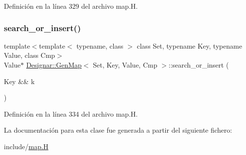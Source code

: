 Definición en la línea 329 del archivo map.\+H.

\mbox{\label{class_designar_1_1_gen_map_ae2ab69b26f782abcd99f99944253d8de}} 
\subsubsection{\texorpdfstring{search\+\_\+or\+\_\+insert()}{search\_or\_insert()}\hspace{0.1cm}{\footnotesize\ttfamily [6/6]}}
{\footnotesize\ttfamily template$<$template$<$ typename, class $>$ class Set, typename Key, typename Value, class Cmp$>$ \\
Value$\ast$ \hyperlink{class_designar_1_1_gen_map}{Designar\+::\+Gen\+Map}$<$ Set, Key, Value, Cmp $>$\+::search\+\_\+or\+\_\+insert (\begin{DoxyParamCaption}\item[{Key \&\&}]{k }\end{DoxyParamCaption})\hspace{0.3cm}{\ttfamily [inline]}}



Definición en la línea 334 del archivo map.\+H.



La documentación para esta clase fue generada a partir del siguiente fichero\+:\begin{DoxyCompactItemize}
\item 
include/\hyperlink{map_8_h}{map.\+H}\end{DoxyCompactItemize}
